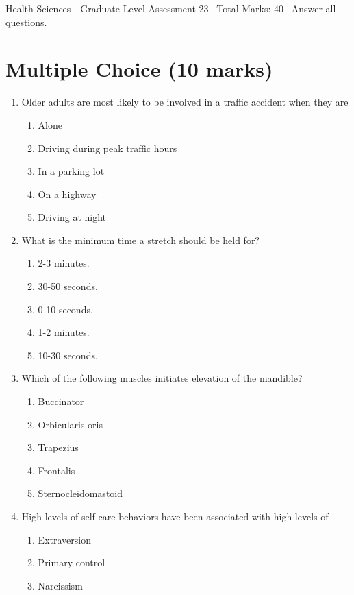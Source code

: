 \documentclass[12pt]{article}
\begin{document}
\begin{center}
Health Sciences - Graduate Level Assessment 23 \
Total Marks: 40 \
Answer all questions.
\end{center}

\section*{Multiple Choice (10 marks)}
\begin{enumerate}[label=\arabic*.]
\item Older adults are most likely to be involved in a traffic accident when they are
\begin{enumerate}[label=(\alph*)]
    \item Alone
    \item Driving during peak traffic hours
    \item In a parking lot
    \item On a highway
    \item Driving at night
\end{enumerate}
\item What is the minimum time a stretch should be held for?
\begin{enumerate}[label=(\alph*)]
    \item 2-3 minutes.
    \item 30-50 seconds.
    \item 0-10 seconds.
    \item 1-2 minutes.
    \item 10-30 seconds.
\end{enumerate}
\item Which of the following muscles initiates elevation of the mandible?
\begin{enumerate}[label=(\alph*)]
    \item Buccinator
    \item Orbicularis oris
    \item Trapezius
    \item Frontalis
    \item Sternocleidomastoid
\end{enumerate}
\item High levels of self-care behaviors have been associated with high levels of
\begin{enumerate}[label=(\alph*)]
    \item Extraversion
    \item Primary control
    \item Narcissism

\end{enumerate}
\end{enumerate}
\end{document}
